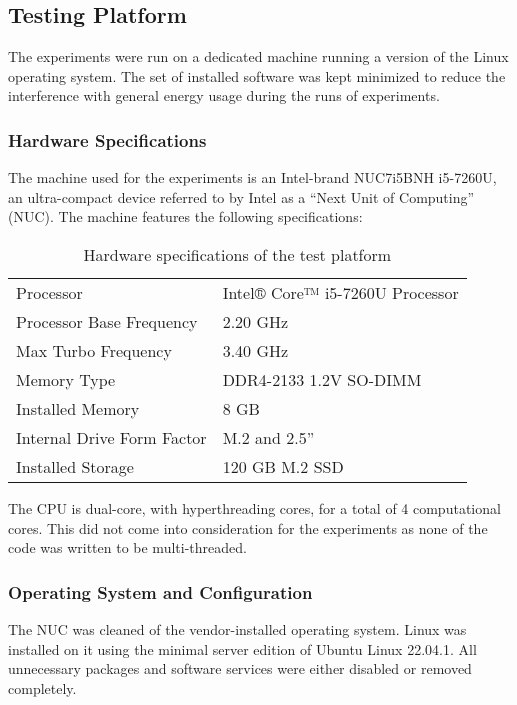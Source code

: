 \subsection{Testing Platform}

The experiments were run on a dedicated machine running a version of the Linux operating system. The set of installed software was kept minimized to reduce the interference with general energy usage during the runs of experiments.

\subsubsection{Hardware Specifications}

The machine used for the experiments is an Intel-brand NUC7i5BNH i5-7260U, an ultra-compact device referred to by Intel as a ``Next Unit of Computing'' (NUC). The machine features the following specifications:

\begin{table}[h!]
\begin{center}
\begin{tabular}{|ll|}
\hline
Processor & Intel® Core™ i5-7260U Processor\\
Processor Base Frequency & 2.20 GHz\\
Max Turbo Frequency & 3.40 GHz\\
Memory Type & DDR4-2133 1.2V SO-DIMM\\
Installed Memory & 8 GB\\
Internal Drive Form Factor & M.2 and 2.5''\\
Installed Storage & 120 GB M.2 SSD\\
\hline
\end{tabular}
\caption{Hardware specifications of the test platform}
\end{center}
\label{table:hardware_specs}
\end{table}

The CPU is dual-core, with hyperthreading cores, for a total of 4 computational cores. This did not come into consideration for the experiments as none of the code was written to be multi-threaded.

\subsubsection{Operating System and Configuration}

The NUC was cleaned of the vendor-installed operating system. Linux was installed on it using the minimal server edition of Ubuntu Linux 22.04.1. All unnecessary packages and software services were either disabled or removed completely.

